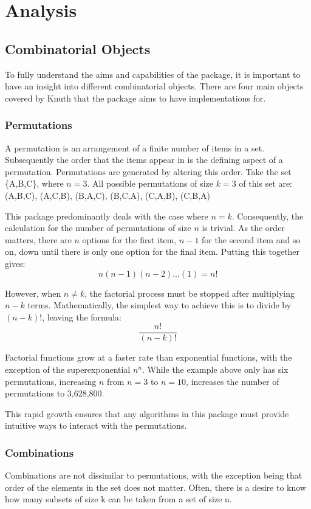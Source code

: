 \documentclass[12pt]{article}
\begin{document}
\section{Analysis}
\subsection{Combinatorial Objects}
To fully understand the aims and capabilities of the package, it is important to have an insight into different combinatorial objects. There are four main objects covered by Knuth that the package aims to have implementations for.

\subsubsection{Permutations}
A permutation is an arrangement of a finite number of items in a set. Subsequently the order that the items appear in is the defining aspect of a permutation. Permutations are generated by altering this order. Take the set \{A,B,C\}, where \(n=3\). All possible permutations of size \(k=3\) of this set are:\\
(A,B,C), (A,C,B), (B,A,C), (B,C,A), (C,A,B), (C,B,A)

This package predominantly deals with the case where \(n=k\). Consequently, the calculation for the number of permutations of size \(n\) is trivial. As the order matters, there are \(n\) options for the first item, \(n-1\) for the second item and so on, down until there is only one option for the final item. Putting this together gives:
\[n(n-1)(n-2)...(1) = n!\]

However, when \(n \neq k\), the factorial process must be stopped after multiplying \(n-k\) terms. Mathematically, the simplest way to achieve this is to divide by \((n-k)!\), leaving the formula:
\[\frac{n!}{(n-k)!}\]

Factorial functions grow at a faster rate than exponential functions, with the exception of the superexponential \(n^n\). While the example above only has six permutations, increasing \(n\) from \(n=3\) to \(n=10\), increases the number of permutations to 3,628,800.

This rapid growth ensures that any algorithms in this package must provide intuitive ways to interact with the permutations.

\subsubsection{Combinations}
Combinations are not dissimilar to permutations, with the exception being that order of the elements in the set does not matter. Often, there is a desire to know how many subsets of size k can be taken from a set of size n.
\end{document}
